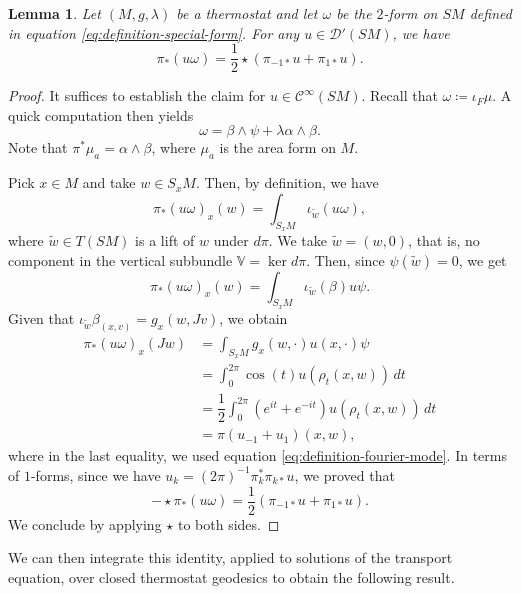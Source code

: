 \documentclass[reqno,12pt,letterpaper]{amsart}
\newtheorem{lemma}[proposition]{Lemma}
\theoremstyle{definition}
\theoremstyle{remark}
\theoremstyle{definition}
\numberwithin{equation}{section}
\begin{document}
\begin{lemma}\label{lemma:first-pairing}
Let $(M, g, \lambda)$ be a thermostat and let $\omega$ be the $2$-form on $SM$ defined in equation \eqref{eq:definition-special-form}. For any $u\in \mathcal{D}'(SM)$, we have 
\begin{equation*}
\pi_\ast (u\omega)=\dfrac{1}{2}\star\left(\pi_{-1\ast}u+\pi_{1\ast}u\right).
\end{equation*}
\end{lemma}
\begin{proof} It suffices to establish the claim for $u\in \mathcal{C}^\infty(SM)$. Recall that $\omega\coloneqq\iota_F\mu$. A quick computation then yields
\begin{equation}\label{eq:useful-for-later}
\omega =\beta\wedge\psi + \lambda\alpha\wedge\beta.
\end{equation}
Note that  $\pi^*\mu_a = \alpha\wedge\beta$, where $\mu_a$ is the area form on $M$.

Pick $x\in M$ and take $w\in S_xM$. Then, by definition, we have
$$\pi_\ast (u\omega)_x (w)=\int_{S_x M}\iota_{\tilde{w}}(u\omega),$$
where $\tilde{w}\in T(SM)$ is a lift of $w$ under $d\pi$. We take $\tilde{w}=(w,0)$, that is, no component in the vertical subbundle $\mathbb{V}=\ker d\pi$. Then, since $\psi(\tilde{w})=0$, we get
$$\pi_\ast (u\omega)_x (w)=\int_{S_x M}\iota_{\tilde{w}}(\beta)u\psi.$$
Given that $\iota_{\tilde{w}}\beta_{(x,v)}=g_x( w, Jv)$, we obtain
\begin{equation*}
\begin{alignedat}{1}
\pi_\ast(u\omega)_x(Jw)&=\int_{S_xM} g_x(w, \cdot) u(x,\cdot) \psi\\
&=\int_0^{2\pi} \cos (t) u(\rho_t(x, w))\, dt\\
&=\dfrac{1}{2}\int_0^{2\pi} (e^{it}+e^{-it}) u(\rho_t(x, w))\, dt\\
&=\pi(u_{-1}+u_1)(x, w),
\end{alignedat}
\end{equation*} 
where in the last equality, we used equation \eqref{eq:definition-fourier-mode}. In terms of $1$-forms, since we have $u_{k}=(2\pi)^{-1}\pi_{k}^*\pi_{k\ast}u $, we proved that 
$$-\star \pi_\ast (u\omega)=\dfrac{1}{2}\left(\pi_{-1\ast}u+\pi_{1\ast}u\right).$$
We conclude by applying $\star$ to both sides. 
\end{proof}

We can then integrate this identity, applied to solutions of the transport equation, over closed thermostat geodesics to obtain the following result.
\end{document}
